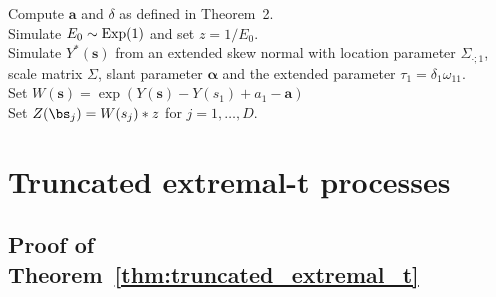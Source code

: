 \documentclass[12pt]{article}
\begin{document}
\begin{algorithm}
\caption{Exact simulation from the skewed Brown-Resnick process at location $\bs_i,i=1,\dots,D$.}
\label{algo:log_skew_normal}
Compute $\bm a$ and $\delta$ as defined in Theorem~2.\\
Simulate $E_0 \sim \rm{Exp}(1)$ and set $z=1/E_0$.\\ 
Simulate $Y^*(\bm s)$ from an extended skew normal with location parameter $\Sigma_{\cdot;1}$, scale matrix $\Sigma$, slant parameter $\bm \alpha$ and the extended parameter $\tau_1=\delta_1 \omega_{11}$.\\
Set $W(\bm s) = \exp(Y(\bm s)-Y(s_1)+a_1 - \bm a)$ \\
Set $Z(\bs_j)=W(s_j)*z$ for $j=1,\dots,D$. \\
\end{algorithm}



\section{Truncated extremal-t processes}
\label{sec:appendix_truncated_extremal_t}

\subsection{Proof of Theorem~\ref{thm:truncated_extremal_t}}
\end{document}
